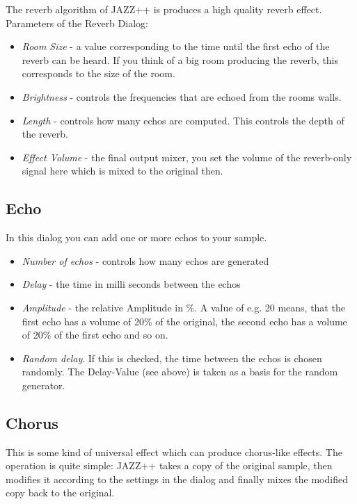 \documentclass[letterpaper]{report}
\begin{document}
The reverb algorithm of JAZZ++ is produces a high quality reverb effect.
Parameters of the Reverb Dialog:

\begin{itemize}
\item {\em Room Size} - a value corresponding to the time until the first
echo of the reverb can be heard. If you think of a big room producing
the reverb, this corresponds to the size of the room.
\item {\em Brightness} - controls the frequencies that are echoed from
the rooms walls.
\item {\em Length} - controls how many echos are computed. This controls the
depth of the reverb.
\item {\em Effect Volume} - the final output mixer, you set the volume of the
reverb-only signal here which is mixed to the original then.
\end{itemize}



\subsection{Echo}

In this dialog you can add one or more echos to your sample.
\begin{itemize}
\item {\em Number of echos} - controls how many echos are generated
\item {\em Delay} - the time in milli seconds between the echos
\item {\em Amplitude} - the relative Amplitude in \%. A value of e.g. 20 means,
that the first echo has a volume of 20\% of the original, the second
echo has a volume of 20\% of the first echo and so on.
\item {\em Random delay}. If this is checked, the time between the echos is
chosen randomly. The Delay-Value (see above) is taken as a basis
for the random generator.
\end{itemize}




\subsection{Chorus}

This is some kind of universal effect which can produce chorus-like effects.
The operation is quite simple: JAZZ++ takes a copy of the original sample,
then modifies it according to the settings in the dialog and finally
mixes the modified copy back to the original.
\end{document}
